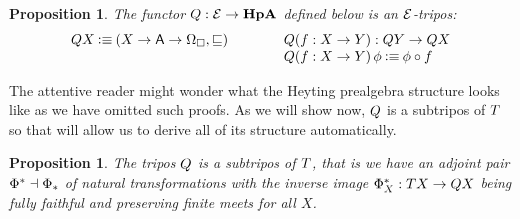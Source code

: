 \documentclass[11pt]{article}
\newtheorem{prop}[thrm]{Proposition}
\begin{document}
\begin{prop}
  The functor \(Q : \mathcal{E} \to \textbf{HpA}\) defined below is an \(\mathcal{E}\)-tripos:
  \[\begin{array}{lll}
    {Q{X}} \mathbin{\vcentcolon\equiv} {({{X}\to{{{\ensuremath{\mathsf{A}}}\to{\Omega_\Box}}}}, \sqsubseteq)}&\qquad&
    {Q{(f:X\to Y)}} : Q{Y} \to Q{X}\\
    &&{Q{(f:X\to Y)}\,\phi} \mathbin{\vcentcolon\equiv} {\phi \circ f}
  \end{array}\]
\end{prop}

The attentive reader might wonder what the Heyting prealgebra structure looks
like as we have omitted such proofs.
%
As we will show now, \(Q\) is a subtripos of \(T\) so that will allow
us to derive all of its structure automatically.

\begin{prop}
  The tripos \(Q\) is a subtripos of \(T\), that is we have an adjoint
  pair \(\Phi^\ast \dashv \Phi_\ast\) of natural transformations with the inverse image
  \(\Phi^\ast_{X} : T{X} \to Q{X}\) being fully faithful and preserving finite
  meets for all \(X\).
\end{prop}
\end{document}

